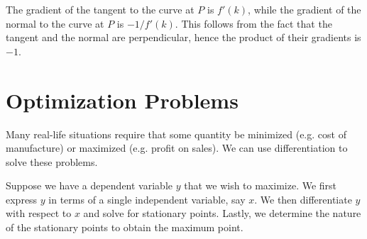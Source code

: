 \begin{figure}[H]
    \centering
    \caption{}
\end{figure}

The gradient of the tangent to the curve at $P$ is $f'(k)$, while the gradient of the normal to the curve at $P$ is $-1/f'(k)$. This follows from the fact that the tangent and the normal are perpendicular, hence the product of their gradients is $-1$.

\section{Optimization Problems}

Many real-life situations require that some quantity be minimized (e.g. cost of manufacture) or maximized (e.g. profit on sales). We can use differentiation to solve these problems.

\begin{recipe}
    Suppose we have a dependent variable $y$ that we wish to maximize. We first express $y$ in terms of a single independent variable, say $x$. We then differentiate $y$ with respect to $x$ and solve for stationary points. Lastly, we determine the nature of the stationary points to obtain the maximum point.
\end{recipe}

